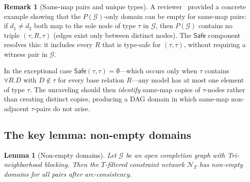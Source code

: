 \documentclass[a4paper,11pt]{article}
\newtheorem{lemma}[theorem]{Lemma}
\theoremstyle{definition}
\newtheorem{remark}[theorem]{Remark}
\newcommand{\Safe}{\ensuremath{\mathsf{Safe}}}
\newcommand{\GG}{\ensuremath{\mathcal{G}}}
\newcommand{\NN}{\ensuremath{\mathcal{N}}}
\begin{document}
\begin{remark}[Same-map pairs and unique types]
\label{rem:same-map-domain}
A reviewer~\cite{GPTReview2} provided a concrete example
showing that the $P(\GG)$-only domain can be empty for
same-map pairs: if $d_1 \neq d_2$ both map to the sole
node of type $\tau$ in $\GG$, then $P(\GG)$ contains no
triple $(\tau, R, \tau)$ (edges exist only between distinct
nodes).  The $\Safe$ component resolves this: it includes
every $R$ that is type-safe for $(\tau, \tau)$, without
requiring a witness pair in $\GG$.

In the exceptional case $\Safe(\tau, \tau) = \emptyset$---which
occurs only when $\tau$ contains $\forall R.D$ with
$D \notin \tau$ for every base relation $R$---any model has at
most one element of type $\tau$.  The unraveling should then
\emph{identify} same-map copies of $\tau$-nodes rather than
creating distinct copies, producing a DAG domain in which same-map
non-adjacent $\tau$-pairs do not arise.
\end{remark}

\subsection{The key lemma: non-empty domains}
\label{sec:key-lemma}

\begin{lemma}[Non-empty domains]\label{lem:tclosed-exist}
Let $\GG$ be an open completion graph with Tri-neighborhood
blocking.  Then the $T$-filtered constraint network $\NN_T$
has non-empty domains for all pairs after arc-consistency.
\end{lemma}
\end{document}

